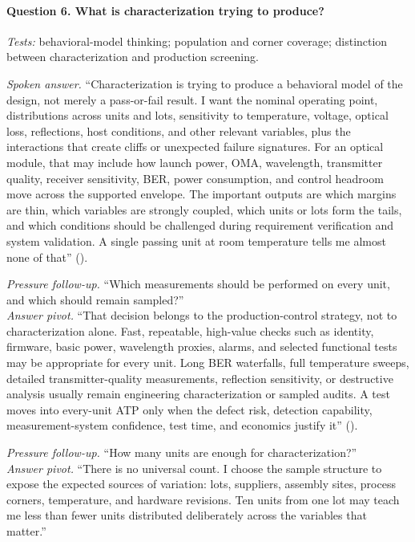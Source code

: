\paragraph{Question 6. What is characterization trying to produce?}
\textit{Tests:} behavioral-model thinking; population and corner coverage;
distinction between characterization and production screening.

\textit{Spoken answer.}
``Characterization is trying to produce a behavioral model of the design, not
merely a pass-or-fail result. I want the nominal operating point, distributions
across units and lots, sensitivity to temperature, voltage, optical loss,
reflections, host conditions, and other relevant variables, plus the
interactions that create cliffs or unexpected failure signatures. For an
optical module, that may include how launch power, OMA, wavelength, transmitter
quality, receiver sensitivity, BER, power consumption, and control headroom
move across the supported envelope. The important outputs are which margins are
thin, which variables are strongly coupled, which units or lots form the tails,
and which conditions should be challenged during requirement verification and
system validation. A single passing unit at room temperature tells me almost
none of that''
().

\textit{Pressure follow-up.} ``Which measurements should be performed on every
unit, and which should remain sampled?''\\
\textit{Answer pivot.} ``That decision belongs to the production-control
strategy, not to characterization alone. Fast, repeatable, high-value checks
such as identity, firmware, basic power, wavelength proxies, alarms, and
selected functional tests may be appropriate for every unit. Long BER
waterfalls, full temperature sweeps, detailed transmitter-quality measurements,
reflection sensitivity, or destructive analysis usually remain engineering
characterization or sampled audits. A test moves into every-unit ATP only when
the defect risk, detection capability, measurement-system confidence, test time,
and economics justify it''
().

\textit{Pressure follow-up.} ``How many units are enough for
characterization?''\\
\textit{Answer pivot.} ``There is no universal count. I choose the sample
structure to expose the expected sources of variation: lots, suppliers,
assembly sites, process corners, temperature, and hardware revisions. Ten units
from one lot may teach me less than fewer units distributed deliberately across
the variables that matter.''

